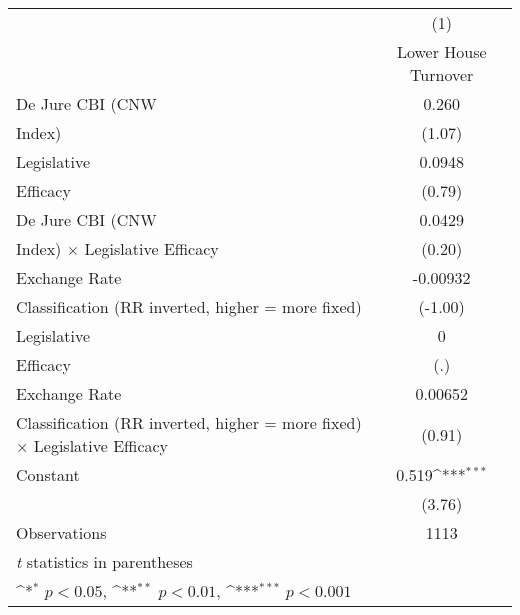 {
\def\sym#1{\ifmmode^{#1}\else\(^{#1}\)\fi}
\begin{tabular}{l*{1}{c}}
\toprule
                &\multicolumn{1}{c}{(1)}\\
                &\multicolumn{1}{c}{Lower House Turnover}\\
\midrule
De Jure CBI (CNW&    0.260         \\
Index)          &   (1.07)         \\
\addlinespace
Legislative     &   0.0948         \\
Efficacy        &   (0.79)         \\
\addlinespace
De Jure CBI (CNW&   0.0429         \\
Index) $\times$ Legislative Efficacy&   (0.20)         \\
\addlinespace
Exchange Rate   & -0.00932         \\
Classification (RR inverted, higher = more fixed)&  (-1.00)         \\
\addlinespace
Legislative     &        0         \\
Efficacy        &      (.)         \\
\addlinespace
Exchange Rate   &  0.00652         \\
Classification (RR inverted, higher = more fixed) $\times$ Legislative Efficacy&   (0.91)         \\
\addlinespace
Constant        &    0.519\sym{***}\\
                &   (3.76)         \\
\midrule
Observations    &     1113         \\
\bottomrule
\multicolumn{2}{l}{\footnotesize \textit{t} statistics in parentheses}\\
\multicolumn{2}{l}{\footnotesize \sym{*} \(p<0.05\), \sym{**} \(p<0.01\), \sym{***} \(p<0.001\)}\\
\end{tabular}
}
